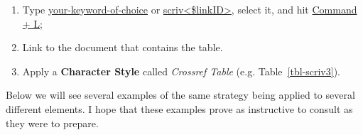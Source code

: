 \documentclass[
  12pt,
  a4paper,
  oneside,
  numbers=noenddot,
  titlepage,
  toclink=all,
  toc=bibliography]{scrbook}
\providecommand{\tightlist}{%
  \setlength{\itemsep}{0pt}\setlength{\parskip}{0pt}}\usepackage{longtable,booktabs,array}
\theoremstyle{definition}
\theoremstyle{definition}
\theoremstyle{definition}
\theoremstyle{plain}
\theoremstyle{plain}
\theoremstyle{plain}
\theoremstyle{plain}
\theoremstyle{plain}
\theoremstyle{remark}
\begin{document}
\begin{tcolorbox}[enhanced jigsaw, titlerule=0mm, left=2mm, toptitle=1mm, colback=white, coltitle=black, rightrule=.15mm, arc=.35mm, title=\textcolor{quarto-callout-tip-color}{\faLightbulb}\hspace{0.5em}{Cross-referencing a table}, colframe=quarto-callout-tip-color-frame, bottomrule=.15mm, colbacktitle=quarto-callout-tip-color!10!white, toprule=.15mm, breakable, bottomtitle=1mm, opacityback=0, opacitybacktitle=0.6, leftrule=.75mm]

\begin{enumerate}
\def\labelenumi{\arabic{enumi}.}
\tightlist
\item
  Type \ul{your-keyword-of-choice} or
  \ul{scriv\textless\$linkID\textgreater{}}, select it, and hit
  \ul{Command + L};
\item
  Link to the document that contains the table.
\item
  Apply a \textbf{Character Style} called \emph{Crossref Table} (e.g.
  \protect\hypertarget{cite_6}{}{\label{cite_6}Table~\ref{tbl-scriv3}}).
\end{enumerate}

\end{tcolorbox}

Below we will see several examples of the same strategy being applied to
several different elements. I hope that these examples prove as
instructive to consult as they were to prepare.
\end{document}
